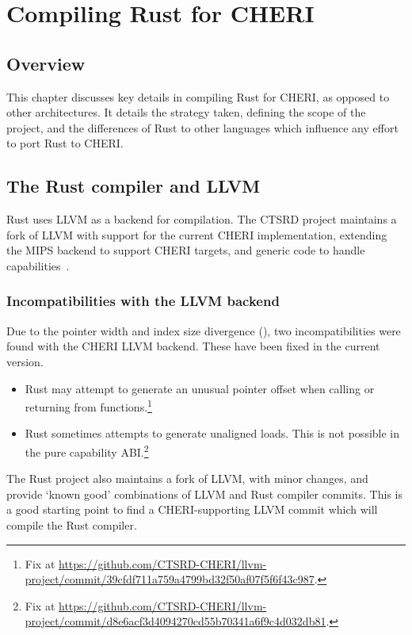 \documentclass[dissertation.tex]{subfiles}
\begin{document}
\chapter{Compiling Rust for CHERI}
\label{ch:impl}


\section{Overview}

This chapter discusses key details in compiling Rust for CHERI, as
opposed to other architectures.
It details the strategy taken, defining the scope of the project, and
the differences of Rust to other languages which influence any effort to
port Rust to CHERI.

\section{The Rust compiler and LLVM}
\label{sec:impl-rustllvm}

Rust uses LLVM as a backend for compilation.
The CTSRD project maintains a fork of LLVM with support for the
current CHERI implementation, extending the MIPS backend to
support CHERI targets, and generic code to handle
capabilities~\cite{cheri-prog-guide}.

\subsection{Incompatibilities with the LLVM backend}
Due to the pointer width and index size divergence
(), two incompatibilities were found with the CHERI
LLVM backend.
These have been fixed in the current version.

\begin{itemize}
    \item Rust may attempt to generate an unusual pointer offset when
    calling or returning from functions.\footnote{Fix at \url{https://github.com/CTSRD-CHERI/llvm-project/commit/39cfdf711a759a4799bd32f50af07f5f6f43c987}.}
    \item Rust sometimes attempts to generate unaligned loads.
    This is not possible in the pure capability ABI.\footnote{Fix at \url{https://github.com/CTSRD-CHERI/llvm-project/commit/d8e6acf3d4094270cd55b70341a6f9c4d032db81}.}
\end{itemize}

The Rust project also maintains a fork of LLVM, with minor changes, and
provide `known good' combinations of LLVM and Rust compiler commits.
This is a good starting point to find a CHERI-supporting LLVM commit
which will compile the Rust compiler.
\end{document}
